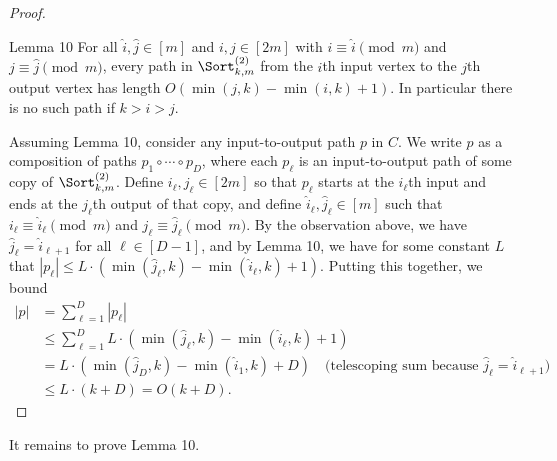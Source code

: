 \begin{proof}
\begin{originalresult}{Lemma 10}
For all $\hat i,\hat j\in[m]$ and $i,j\in[2m]$ with $i\equiv\hat i\pmod m$ and $j\equiv\hat j\pmod m$, every path in $\Sort^{(2)}_{k,m}$ from the $i$th input vertex to the $j$th output vertex has length $O(\min(j,k)-\min(i,k)+1)$. In particular there is no such path if $k>i>j$.
\end{originalresult}
Assuming Lemma 10, consider any input-to-output path $p$ in $C$. We write $p$ as a composition of paths $p_1\circ\cdots\circ p_D$, where each $p_\ell$ is an input-to-output path of some copy of $\Sort^{(2)}_{k,m}$. Define $i_\ell,j_\ell\in[2m]$ so that $p_\ell$ starts at the $i_\ell$th input and ends at the $j_\ell$th output of that copy, and define $\hat i_\ell,\hat j_\ell\in[m]$ such that $i_\ell\equiv\hat i_\ell\pmod m$ and $j_\ell\equiv\hat j_\ell\pmod m$. By the observation above, we have $\hat j_\ell=\hat i_{\ell+1}$ for all $\ell\in[D-1]$, and by Lemma 10, we have for some constant $L$ that $|p_\ell|\le L\cdot(\min(\hat j_\ell,k)-\min(\hat i_\ell,k)+1)$.
Putting this together, we bound
\begin{align*}
|p|&=\sum_{\ell=1}^D|p_\ell|\\
&\le\sum_{\ell=1}^D L\cdot(\min(\hat j_\ell,k)-\min(\hat i_\ell,k)+1)\\
&=L\cdot(\min(\hat j_D,k)-\min(\hat i_1,k)+D)\quad\text{(telescoping sum because $\hat j_\ell=\hat i_{\ell+1}$)}\\
&\le L\cdot(k+D)=O(k+D).
\end{align*}
\end{proof}
It remains to prove Lemma 10.

